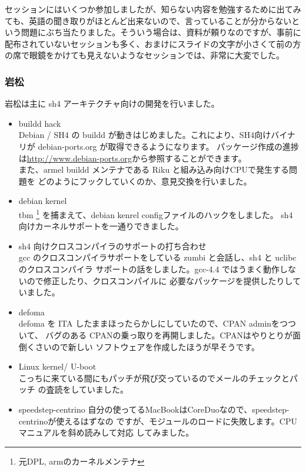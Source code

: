 \documentclass[mingoth,a4paper]{jsarticle}
\begin{document}
セッションにはいくつか参加しましたが、知らない内容を勉強するために出てみ
ても、英語の聞き取りがほとんど出来ないので、言っていることが分からないと
いう問題にぶち当たりました。そういう場合は、資料が頼りなのですが、事前に
配布されていないセッションも多く、おまけにスライドの文字が小さくて前の方
の席で眼鏡をかけても見えないようなセッションでは、非常に大変でした。





\subsubsection{岩松}
岩松は主に sh4 アーキテクチャ向けの開発を行いました。
\begin{itemize}
\item buildd hack\\
Debian / SH4 の buildd が動きはじめました。これにより、SH4向けバイナリが debian-ports.org
が取得できるようになります。
パッケージ作成の進捗は\url{http://www.debian-ports.org}から参照することができます。
\\
また、armel buildd メンテナである Riku と組み込み向けCPUで発生する問題を
どのようにフックしていくのか、意見交換を行いました。
\item debian kernel\\
tbm \footnote{元DPL, armのカーネルメンテナ} を捕まえて、debian kenrel configファイルのハックをしました。
sh4 向けカーネルサポートを一通りできました。

\item sh4 向けクロスコンパイラのサポートの打ち合わせ\\
gcc のクロスコンパイラサポートをしている zumbi と会話し、sh4 と uclibcのクロスコンパイラ
サポートの話をしました。gcc-4.4 ではうまく動作しないので修正したり、クロスコンパイルに
必要なパッケージを提供したりしていました。

\item defoma\\
defoma を ITA したままほったらかしにしていたので、CPAN adminをつついて、
バグのある CPANの乗っ取りを再開しました。CPANはやりとりが面倒くさいので新しい
ソフトウェアを作成したほうが早そうです。

\item Linux kernel/ U-boot \\ 
こっちに来ている間にもパッチが飛び交っているのでメールのチェックとパッチ
の査読をしていました。

\item speedstep-centrino
自分の使ってるMacBookはCoreDuoなので、speedstep-centrinoが使えるはずなの
ですが、モジュールのロードに失敗します。CPUマニュアルを斜め読みして対応
してみました。


\end{itemize}
\end{document}
